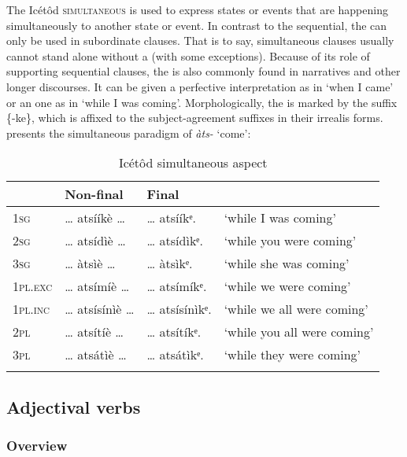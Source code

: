 The Icétôd \textsc{simultaneous}  is used to express states or events that are happening simultaneously to another state or event. In contrast to the sequential, the  can only be used in subordinate clauses. That is to say, simultaneous clauses usually cannot stand alone without a  (with some exceptions). Because of its role of supporting sequential clauses, the  is also commonly found in narratives and other longer discourses. It can be given a perfective interpretation as in ‘when I came’ or an  one as in ‘while I was coming’. Morphologically, the  is marked by the suffix \{-ke\}, which is affixed to the subject-agreement suffixes in their irrealis forms.  presents the simultaneous paradigm of \textit{àts-} ‘come’:


\begin{table}
\caption{Icétôd simultaneous aspect}
\label{tab:verbs:sim}


\begin{tabularx}{\textwidth}{XXXl}
\lsptoprule

& Non-final & Final & \\
\midrule
\textsc{1sg} & {\dots} atsííkè {\dots} & {\dots} atsííkᵉ. & ‘while I was coming’\\
\textsc{2sg} & {\dots} atsídìè {\dots} & {\dots} atsídìkᵉ. & ‘while you were coming’\\
\textsc{3sg} & {\dots} àtsìè {\dots} & {\dots} àtsìkᵉ. & ‘while she was coming’\\
\textsc{1pl.exc} & {\dots} atsímíè {\dots} & {\dots} atsímíkᵉ. & ‘while we were coming’\\
\textsc{1pl.inc} & {\dots} atsísínìè {\dots} & {\dots} atsísínìkᵉ. & ‘while we all were coming’\\
\textsc{2pl} & {\dots} atsítíè {\dots} & {\dots} atsítíkᵉ. & ‘while you all were coming’\\
\textsc{3pl} & {\dots} atsátìè {\dots} & {\dots} atsátìkᵉ. & ‘while they were coming’\\
\lspbottomrule
\end{tabularx}
\end{table}



\subsection{Adjectival verbs}\label{sec:8.11}
\subsubsection{Overview}\label{sec:8.11.1}


